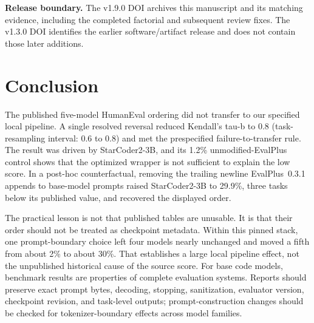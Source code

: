 \documentclass[10pt,twocolumn]{article}
\begin{document}
\noindent\textbf{Release boundary.} The v1.9.0 DOI archives this manuscript and
its matching evidence, including the completed factorial and subsequent review
fixes. The v1.3.0 DOI identifies the earlier software/artifact release and does
not contain those later additions.

\section{Conclusion}

The published five-model HumanEval ordering did not transfer to our specified local pipeline. A single resolved reversal reduced Kendall's tau-b to 0.8 (task-resampling interval: 0.6 to 0.8) and met the prespecified failure-to-transfer rule. The result was driven by StarCoder2-3B, and its 1.2\% unmodified-EvalPlus control shows that the optimized wrapper is not sufficient to explain the low score. In a post-hoc counterfactual, removing the trailing newline EvalPlus~0.3.1 appends to base-model prompts raised StarCoder2-3B to 29.9\%, three tasks below its published value, and recovered the displayed order.

The practical lesson is not that published tables are unusable. It is that their order should not be treated as checkpoint metadata. Within this pinned stack, one prompt-boundary choice left four models nearly unchanged and moved a fifth from about 2\% to about 30\%. That establishes a large local pipeline effect, not the unpublished historical cause of the source score. For base code models, benchmark results are properties of complete evaluation systems. Reports should preserve exact prompt bytes, decoding, stopping, sanitization, evaluator version, checkpoint revision, and task-level outputs; prompt-construction changes should be checked for tokenizer-boundary effects across model families.

\scriptsize
\setlength{\bibsep}{0.15em}


\end{document}
